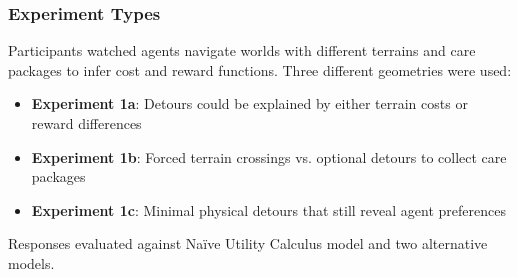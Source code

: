 \documentclass{beamer}
\begin{document}
\begin{frame}
\frametitle{Experiment Types}
Participants watched agents navigate worlds with different terrains and care packages to infer cost and reward functions. Three different geometries were used:

\vspace{0.3cm}
\begin{itemize}
    \item \textbf{Experiment 1a}: Detours could be explained by either terrain costs or reward differences
    
    \item \textbf{Experiment 1b}: Forced terrain crossings vs. optional detours to collect care packages
    
    \item \textbf{Experiment 1c}: Minimal physical detours that still reveal agent preferences
\end{itemize}

\vspace{0.3cm}
Responses evaluated against Naïve Utility Calculus model and two alternative models.
\end{frame}
\end{document}
